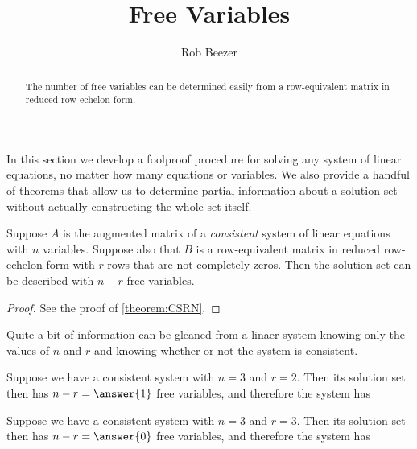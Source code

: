 \documentclass{ximera}
\author{Rob Beezer}
\title{Free Variables}
\begin{document}
\begin{abstract}
  The number of free variables can be determined easily from a
  row-equivalent matrix in reduced row-echelon form.
\end{abstract}
\maketitle

In this section we develop a foolproof procedure for solving any system of linear equations, no matter how many equations or variables.  We also provide a handful of theorems that allow us to determine partial information about a solution set without actually constructing the whole set itself.

\begin{theorem}
\label{theorem:FVCS}

Suppose $A$ is the augmented matrix of a \textit{consistent} system of
linear equations with $n$ variables.  Suppose also that $B$ is a
row-equivalent matrix in reduced row-echelon form with $r$ rows that
are not completely zeros.  Then the solution set can be described with
$n-r$ free variables.

\begin{proof}
See the proof of \ref{theorem:CSRN}.
\end{proof}
\end{theorem}

Quite a bit of information can be gleaned from a linaer system knowing
only the values of $n$ and $r$ and knowing whether or not the system
is consistent.

\begin{example}
Suppose we have a consistent system with $n=3$ and $r=2$.  Then its solution set then has $n-r=\answer{1}$ free variables, and therefore the system has
\begin{multipleChoice}
\end{multipleChoice}
\end{example}

\begin{example}
Suppose we have a consistent system with $n=3$ and $r=3$.  Then its solution set then has $n-r=\answer{0}$ free variables, and therefore the system has
\begin{multipleChoice}
\end{multipleChoice}
\end{example}
\end{document}
